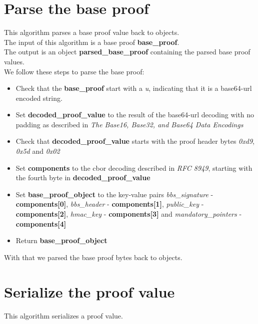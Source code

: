 \documentclass[
	a4paper               %
	,bibliography=totoc   %
	,listof=totoc         %
	,monolingual
]{bfhthesis}              %
\begin{document}
\section{Parse the base proof}
\label{subsub:parsebaseproof}

This algorithm parses a base proof value back to objects.\\

The input of this algorithm is a base proof \textbf{base\_proof}.\\

The output is an object \textbf{parsed\_base\_proof} containing the parsed base proof values.\\

We follow these steps to parse the base proof:
\begin{itemize}
	\item Check that the \textbf{base\_proof} start with a \textit{u}, indicating that it is a base64-url encoded string.
	\item Set \textbf{decoded\_proof\_value} to the result of the base64-url decoding with no padding as described in \textit{The Base16, Base32, and Base64 Data Encodings}\cite{base64}
	\item Check that \textbf{decoded\_proof\_value} starts with the proof header bytes \textit{0xd9}, \textit{0x5d} and \textit{0x02}
	\item Set \textbf{components} to the cbor decoding described in \textit{RFC 8949}\cite{cbor}, starting with the fourth byte in \textbf{decoded\_proof\_value}
	\item Set \textbf{base\_proof\_object} to the key-value pairs \textit{bbs\_signature} - \textbf{components[0]}, \textit{bbs\_header} - \textbf{components[1]}, \textit{public\_key} - \textbf{components[2]}, \textit{hmac\_key} - \textbf{components[3]} and \textit{mandatory\_pointers} - \textbf{components[4]}
	\item Return \textbf{base\_proof\_object}
\end{itemize}

With that we parsed the base proof bytes back to objects.

\section{Serialize the proof value}
\label{subsub:serializebaseproof}

This algorithm serializes a proof value.\\
\end{document}

